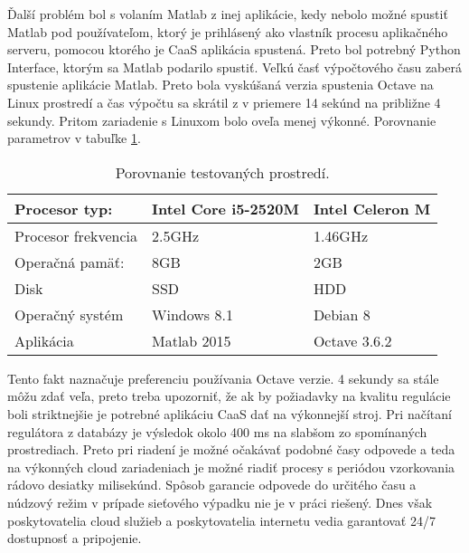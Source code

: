 \indent Ďalší problém bol s volaním Matlab z inej aplikácie, kedy nebolo možné spustiť Matlab pod používateľom, ktorý je prihlásený ako vlastník procesu aplikačného serveru, pomocou ktorého je CaaS aplikácia spustená. Preto bol potrebný Python Interface, ktorým sa Matlab podarilo spustiť. Veľkú časť výpočtového času zaberá spustenie aplikácie Matlab. Preto bola vyskúšaná verzia spustenia Octave na Linux prostredí a čas výpočtu sa skrátil z v priemere 14 sekúnd na približne 4 sekundy. Pritom zariadenie s Linuxom bolo oveľa menej výkonné. Porovnanie parametrov v tabuľke  \ref{table:2}.
\begin{table}[h!]
\centering
 \caption{Porovnanie testovaných prostredí.}
 \begin{tabular}{ |p{4cm}|p{5.5cm}p{5.5cm}| } 
 \hline
 Procesor typ: & Intel Core i5-2520M & Intel Celeron M \\ 
  \hline
 Procesor frekvencia &  2.5GHz  & 1.46GHz   \\ 
 \hline
 Operačná pamäť: & 8GB & 2GB  \\ 
 \hline
 Disk & SSD & HDD \\
 \hline
 Operačný systém & Windows 8.1 & Debian 8 \\ 
 \hline
 Aplikácia & Matlab 2015 & Octave 3.6.2 \\  
 \hline
\end{tabular}
\label{table:2}
\end{table}
Tento fakt naznačuje preferenciu používania Octave verzie. 4 sekundy sa stále môžu zdať veľa, preto treba upozorniť, že ak by požiadavky na kvalitu regulácie boli striktnejšie je potrebné aplikáciu CaaS dať na výkonnejší stroj. Pri  načítaní regulátora z databázy je výsledok okolo 400 ms na slabšom zo spomínaných prostrediach. Preto pri riadení je možné očakávať podobné časy odpovede a teda na výkonných cloud zariadeniach je možné riadiť procesy s periódou vzorkovania rádovo desiatky milisekúnd. Spôsob garancie odpovede do určitého času a núdzový režim v prípade sieťového výpadku nie je v práci riešený. Dnes však poskytovatelia cloud služieb a poskytovatelia internetu vedia garantovať 24/7 dostupnosť a pripojenie.


